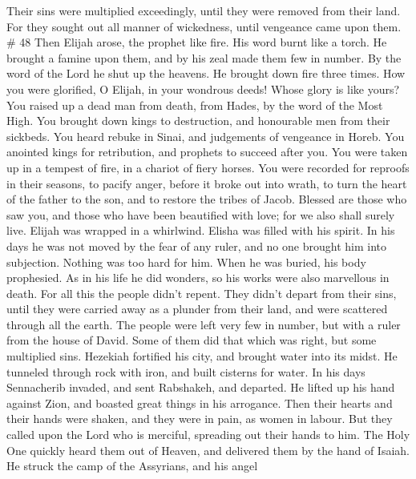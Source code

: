 Their sins were multiplied exceedingly, until they were removed from
their land.  For they sought out all manner of wickedness,
until vengeance came upon them. \# 48  Then Elijah arose,
the prophet like fire. His word burnt like a torch.  He
brought a famine upon them, and by his zeal made them few in number.
 By the word of the Lord he shut up the heavens. He brought
down fire three times.  How you were glorified, O Elijah, in
your wondrous deeds! Whose glory is like yours?  You raised
up a dead man from death, from Hades, by the word of the Most High.
 You brought down kings to destruction, and honourable men
from their sickbeds.  You heard rebuke in Sinai, and
judgements of vengeance in Horeb.  You anointed kings for
retribution, and prophets to succeed after you.  You were
taken up in a tempest of fire, in a chariot of fiery horses.
 You were recorded for reproofs in their seasons, to pacify
anger, before it broke out into wrath, to turn the heart of the father
to the son, and to restore the tribes of Jacob.  Blessed
are those who saw you, and those who have been beautified with love; for
we also shall surely live.  Elijah was wrapped in a
whirlwind. Elisha was filled with his spirit. In his days he was not
moved by the fear of any ruler, and no one brought him into subjection.
 Nothing was too hard for him. When he was buried, his body
prophesied.  As in his life he did wonders, so his works
were also marvellous in death.  For all this the people
didn't repent. They didn't depart from their sins, until they were
carried away as a plunder from their land, and were scattered through
all the earth. The people were left very few in number, but with a ruler
from the house of David.  Some of them did that which was
right, but some multiplied sins.  Hezekiah fortified his
city, and brought water into its midst. He tunneled through rock with
iron, and built cisterns for water.  In his days
Sennacherib invaded, and sent Rabshakeh, and departed. He lifted up his
hand against Zion, and boasted great things in his arrogance.
 Then their hearts and their hands were shaken, and they
were in pain, as women in labour.  But they called upon the
Lord who is merciful, spreading out their hands to him. The Holy One
quickly heard them out of Heaven, and delivered them by the hand of
Isaiah.  He struck the camp of the Assyrians, and his angel
